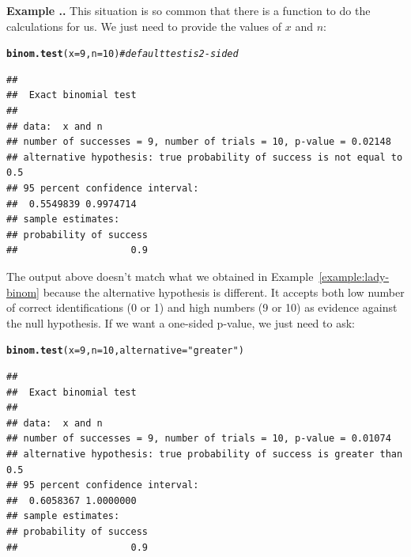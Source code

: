 \documentclass[twoside]{book}
\makeatletter
\newcommand{\hlnum}[1]{\textcolor[rgb]{0.686,0.059,0.569}{#1}}%
\newcommand{\hlstr}[1]{\textcolor[rgb]{0.192,0.494,0.8}{#1}}%
\newcommand{\hlcom}[1]{\textcolor[rgb]{0.678,0.584,0.686}{\textit{#1}}}%
\newcommand{\hlstd}[1]{\textcolor[rgb]{0.345,0.345,0.345}{#1}}%
\newcommand{\hlkwc}[1]{\textcolor[rgb]{0.333,0.667,0.333}{#1}}%
\newcommand{\hlkwd}[1]{\textcolor[rgb]{0.737,0.353,0.396}{\textbf{#1}}}%
\newenvironment{kframe}{%
 \def\at@end@of@kframe{}%
 \ifinner\ifhmode%
  \def\at@end@of@kframe{\end{minipage}}%
  \begin{minipage}{\columnwidth}%
 \fi\fi%
 \def\FrameCommand##1{\hskip\@totalleftmargin \hskip-\fboxsep
 \colorbox{shadecolor}{##1}\hskip-\fboxsep
     \hskip-\linewidth \hskip-\@totalleftmargin \hskip\columnwidth}%
 \MakeFramed {\advance\hsize-\width
   \@totalleftmargin\z@ \linewidth\hsize
   \@setminipage}}%
 {\par\unskip\endMakeFramed%
 \at@end@of@kframe}
\newenvironment{knitrout}{}{} %
\newcounter{example}[section]
\newenvironment{example}%
{\refstepcounter{example}%
\textbf{Example \thesection.\arabic{example}. }}%
{}
\makeatother
\begin{document}
\begin{example}
	This situation is so common that there is a function to do the calculations for us.
	We just need to provide the values of $x$ and $n$:
\begin{knitrout}
\color{fgcolor}\begin{kframe}
\begin{alltt}
\hlkwd{binom.test}\hlstd{(}\hlkwc{x} \hlstd{=} \hlnum{9}\hlstd{,} \hlkwc{n} \hlstd{=} \hlnum{10}\hlstd{)}  \hlcom{# default test is 2-sided}
\end{alltt}
\begin{verbatim}
## 
## 	Exact binomial test
## 
## data:  x and n
## number of successes = 9, number of trials = 10, p-value = 0.02148
## alternative hypothesis: true probability of success is not equal to 0.5
## 95 percent confidence interval:
##  0.5549839 0.9974714
## sample estimates:
## probability of success 
##                    0.9
\end{verbatim}
\end{kframe}
\end{knitrout}
	The output above doesn't match what we obtained in Example~\ref{example:lady-binom}
	because the alternative hypothesis is different.  It accepts both low number of correct
	identifications (0 or 1) and high numbers (9 or 10) as evidence against the null
	hypothesis.  If we want a one-sided p-value, we just need to ask:
\begin{knitrout}
\color{fgcolor}\begin{kframe}
\begin{alltt}
\hlkwd{binom.test}\hlstd{(}\hlkwc{x} \hlstd{=} \hlnum{9}\hlstd{,} \hlkwc{n} \hlstd{=} \hlnum{10}\hlstd{,} \hlkwc{alternative} \hlstd{=} \hlstr{"greater"}\hlstd{)}
\end{alltt}
\begin{verbatim}
## 
## 	Exact binomial test
## 
## data:  x and n
## number of successes = 9, number of trials = 10, p-value = 0.01074
## alternative hypothesis: true probability of success is greater than 0.5
## 95 percent confidence interval:
##  0.6058367 1.0000000
## sample estimates:
## probability of success 
##                    0.9
\end{verbatim}
\end{kframe}
\end{knitrout}

\end{example}
\end{document}
